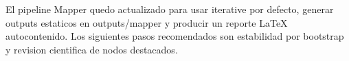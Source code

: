 El pipeline Mapper quedo actualizado para usar iterative por defecto, generar outputs estaticos en outputs/mapper y producir un reporte LaTeX autocontenido. Los siguientes pasos recomendados son estabilidad por bootstrap y revision cientifica de nodos destacados.
